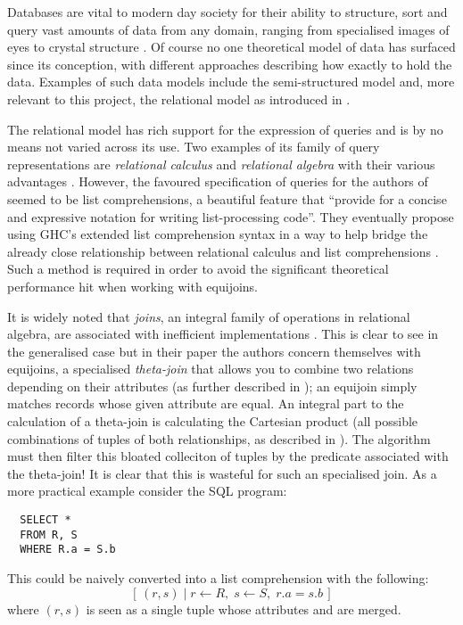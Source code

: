 Databases are vital to modern day society for their ability to structure, sort and query vast amounts of data from any domain, ranging from specialised images of eyes  to crystal structure \cite{CambridgeStructuralDatabase}. Of course no one theoretical model of data has surfaced since its conception, with different approaches describing how exactly to hold the data. Examples of such data models include the semi-structured model \cite{DatabaseSystems} and, more relevant to this project, the relational model \cite{RelationalModel} as introduced in .

The relational model has rich support for the expression of queries and is by no means not varied across its use. Two examples of its family of query representations are \emph{relational calculus} and \emph{relational algebra} with their various advantages \cite{RelationalCalculus,RelationalModel}.  However, the favoured specification of queries for the authors of \cite{RelationalAlgebraByWayOfAdjunctions} seemed to be list comprehensions, a beautiful feature that ``provide for a concise and expressive notation for writing list-processing code''. \cite{MonadComprehensions} They eventually propose using GHC's extended list comprehension syntax in a way to help bridge the already close relationship between relational calculus and list comprehensions \cite{GHCListComprehension,ComprehensiveComprehensions}. Such a method is required in order to avoid the significant theoretical performance hit when working with equijoins.

It is widely noted that \emph{joins}, an integral family of operations in relational algebra, are associated with inefficient implementations \cite{JoinProcessing}. This is clear to see in the generalised case but in their paper \cite{RelationalAlgebraByWayOfAdjunctions} the authors concern themselves with equijoins, a specialised \emph{theta-join} that allows you to combine two relations depending on their attributes (as further described in ); an equijoin simply matches records whose given attribute are equal. An integral part to the calculation of a theta-join is calculating the Cartesian product (all possible combinations of tuples of both relationships, as described in ). The algorithm must then filter this bloated colleciton of tuples by the predicate associated with the theta-join! It is clear that this is wasteful for such an specialised join. As a more practical example consider the SQL program:
\begin{lstlisting}
  SELECT *
  FROM R, S
  WHERE R.a = S.b
\end{lstlisting}
This could be naively converted into a list comprehension with the following:
\[
  \left[\,(r, s)\;|\;r \leftarrow R,\;s \leftarrow S,\;r.a = s.b\,\right]
\]
where $(r, s)$ is seen as a single tuple whose attributes  and  are merged. 

